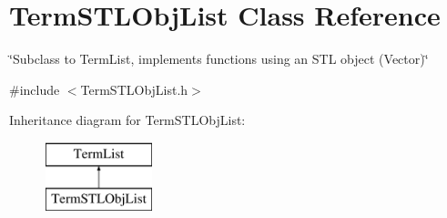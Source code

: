 \hypertarget{classTermSTLObjList}{\section{Term\-S\-T\-L\-Obj\-List Class Reference}
\label{classTermSTLObjList}
}


\char`\"{}\-Subclass to Term\-List, implements functions using an S\-T\-L object (\-Vector)\char`\"{}  




{\ttfamily \#include $<$Term\-S\-T\-L\-Obj\-List.\-h$>$}

Inheritance diagram for Term\-S\-T\-L\-Obj\-List\-:\begin{figure}[H]
\begin{center}
\leavevmode
\includegraphics[height=2.000000cm]{classTermSTLObjList}
\end{center}
\end{figure}
